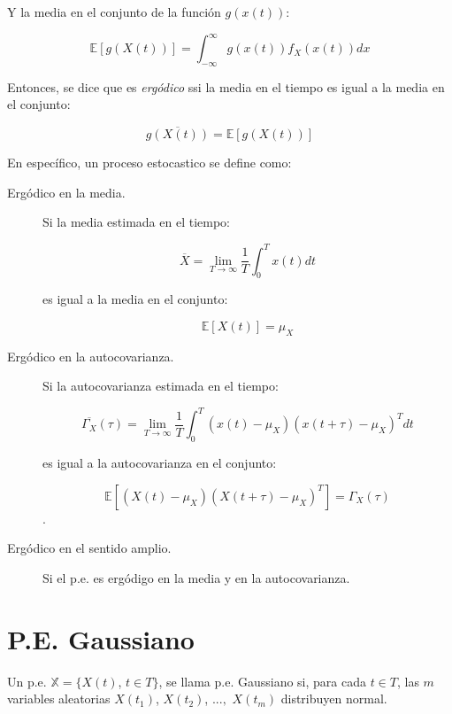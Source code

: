 Y la media en el conjunto de la función $g(x(t))$:

$$ \mathbb{E}\left[g(X(t))\right] = \int_{-\infty}^{\infty} g(x(t)) f_X(x(t)) dx$$

Entonces, se dice que es \emph{ergódico} ssi la media en el tiempo es igual a la media en el conjunto:

$$ \overline{g(X(t))} = \mathbb{E}\left[g(X(t))\right]$$

En específico, un proceso estocastico se define como:

\begin{description}
    \item[Ergódico en la media.] Si la media estimada en el tiempo:
    
    $$\overline{X} = \lim_{T \to \infty} \frac{1}{T} \int_0^T x(t) dt$$
    
    \noindent es igual a la media en el conjunto:
    
    $$\mathbb{E}\left[X(t)\right] = \mu_X$$

    \item[Ergódico en la autocovarianza.] Si la autocovarianza estimada en el tiempo:

    $$\overline{\Gamma_X}(\tau) = \lim_{T \to \infty} \frac{1}{T} \int_0^T (x(t)- \mu_X)(x(t+\tau)- \mu_X)^T dt$$

    \noindent es igual a la autocovarianza en el conjunto:
    
    $$\mathbb{E}\left[ (X(t)- \mu_X)(X(t+\tau)- \mu_X)^T \right] = \Gamma_X(\tau)$$.

    \item[Ergódico en el sentido amplio.] Si el p.e. es ergódigo en la media y en la autocovarianza.
    
\end{description}



\section{P.E. Gaussiano}
Un p.e. $\mathbb{X} = \{X(t)$, $t \in T\}$, se llama p.e. Gaussiano si, para cada $t\in T$, las $m$ variables aleatorias $X(t_1)$, $X(t_2)$, $...,$ $X(t_m)$ distribuyen normal.

